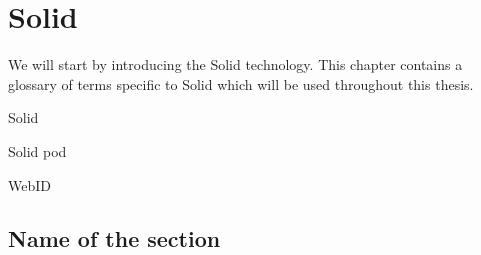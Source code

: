 \chapter{Solid}
We will start by introducing the Solid technology.
This chapter contains a glossary of terms specific to Solid which will be used throughout this thesis.

Solid

Solid pod

WebID

\section{Name of the section}
